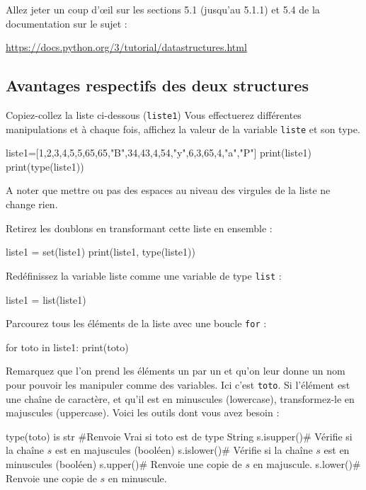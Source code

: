  Allez jeter un coup d'œil sur les sections 5.1 (jusqu'au 5.1.1) et 5.4 de la documentation sur le sujet : 

 \url{https://docs.python.org/3/tutorial/datastructures.html}\\

\subsection{Avantages respectifs des deux structures}

\exer

 Copiez-collez la liste ci-dessous (\texttt{liste1}) Vous effectuerez différentes manipulations et à chaque fois, affichez la valeur de la variable \texttt{liste} et son type.

\begin{python}
liste1=[1,2,3,4,5,5,65,65,"B",34,43,4,54,"y",6,3,65,4,"a","P"]
print(liste1)
print(type(liste1))
\end{python}

A noter que mettre ou pas des espaces au niveau des virgules de la liste ne change rien.

 Retirez les doublons en transformant cette liste en ensemble :

\begin{python}
liste1 = set(liste1)
print(liste1, type(liste1))
\end{python}

 Redéfinissez la variable liste comme une variable de type \texttt{list} :

\begin{python}
liste1 = list(liste1)
\end{python}


Parcourez tous les éléments de la liste avec une boucle \texttt{for} :

\begin{python}
for toto in liste1:
  print(toto)
\end{python}

Remarquez que l'on prend les éléments un par un et qu'on leur donne un nom pour pouvoir les manipuler comme des variables. Ici c'est \texttt{toto}. 
 Si l'élément est une chaîne de caractère, et qu'il est en minuscules (lowercase), transformez-le en majuscules (uppercase). Voici les outils dont vous avez besoin :

\begin{python}
type(toto) is str #Renvoie Vrai si toto est de type String
s.isupper()# Vérifie si la chaîne $s$ est en majuscules (booléen)
s.islower()# Vérifie si la chaîne $s$ est en minuscules (booléen)
s.upper()# Renvoie une copie de $s$ en majuscule.
s.lower()# Renvoie une copie de $s$ en minuscule.
\end{python}

